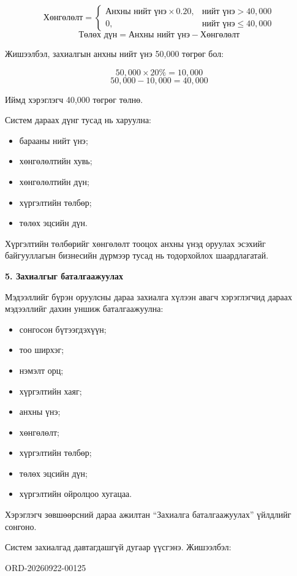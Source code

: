 $$ \text{Хөнгөлөлт}= \begin{cases} \text{Анхны нийт үнэ}\times 0.20, & \text{нийт үнэ}>40,000\\ 0, & \text{нийт үнэ}\leq40,000 \end{cases} $$ $$ \text{Төлөх дүн}=\text{Анхны нийт үнэ}-\text{Хөнгөлөлт} $$

Жишээлбэл, захиалгын анхны нийт үнэ 50,000 төгрөг бол:

$$ 50,000\times20\%=10,000 $$ $$ 50,000-10,000=40,000 $$

Иймд хэрэглэгч 40,000 төгрөг төлнө.

Систем дараах дүнг тусад нь харуулна:

\begin{itemize}
    \item барааны нийт үнэ;
    \item хөнгөлөлтийн хувь;
    \item хөнгөлөлтийн дүн;
    \item хүргэлтийн төлбөр;
    \item төлөх эцсийн дүн.
\end{itemize}

Хүргэлтийн төлбөрийг хөнгөлөлт тооцох анхны үнэд оруулах эсэхийг байгууллагын бизнесийн дүрмээр тусад нь тодорхойлох шаардлагатай.

\textbf{5. Захиалгыг баталгаажуулах}

Мэдээллийг бүрэн оруулсны дараа захиалга хүлээн авагч хэрэглэгчид дараах мэдээллийг дахин уншиж баталгаажуулна:

\begin{itemize}
    \item сонгосон бүтээгдэхүүн;
    \item тоо ширхэг;
    \item нэмэлт орц;
    \item хүргэлтийн хаяг;
    \item анхны үнэ;
    \item хөнгөлөлт;
    \item хүргэлтийн төлбөр;
    \item төлөх эцсийн дүн;
    \item хүргэлтийн ойролцоо хугацаа.
\end{itemize}

Хэрэглэгч зөвшөөрсний дараа ажилтан “Захиалга баталгаажуулах” үйлдлийг сонгоно.

Систем захиалгад давтагдашгүй дугаар үүсгэнэ. Жишээлбэл:

ORD-20260922-00125

